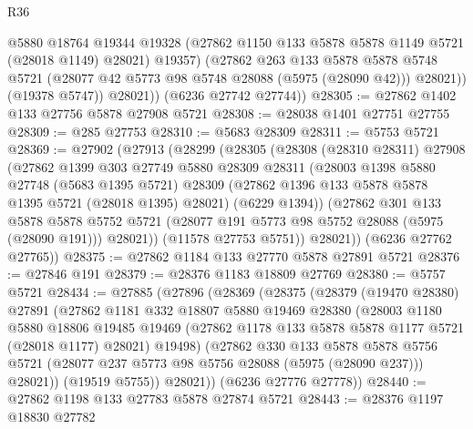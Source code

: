 \begin{lexlean}{R36}
\begin{coremodule}
                @5880
                @18764
                @19344
                @19328
                (@27862 @1150 @133 @5878 @5878 @1149 @5721 (@28018 @1149) @28021)
                @19357)
              (@27862
                @263
                @133
                @5878
                @5878
                @5748
                @5721
                (@28077 @42 @5773 @98 @5748 @28088 (@5975 (@28090 @42)))
                @28021))
            (@19378 @5747))
          @28021))
      (@6236 @27742 @27744))
@28305 := @27862 @1402 @133 @27756 @5878 @27908 @5721
@28308 := @28038 @1401 @27751 @27755
@28309 := @285 @27753
@28310 := @5683 @28309
@28311 := @5753 @5721
@28369 := @27902
    (@27913
      (@28299
        (@28305
          (@28308
            (@28310 @28311)
            @27908
            (@27862
              @1399
              @303
              @27749
              @5880
              @28309
              @28311
              (@28003
                @1398
                @5880
                @27748
                (@5683 @1395 @5721)
                @28309
                (@27862 @1396 @133 @5878 @5878 @1395 @5721 (@28018 @1395) @28021)
                (@6229 @1394))
              (@27862
                @301
                @133
                @5878
                @5878
                @5752
                @5721
                (@28077 @191 @5773 @98 @5752 @28088 (@5975 (@28090 @191)))
                @28021))
            (@11578 @27753 @5751))
          @28021))
      (@6236 @27762 @27765))
@28375 := @27862 @1184 @133 @27770 @5878 @27891 @5721
@28376 := @27846 @191
@28379 := @28376 @1183 @18809 @27769
@28380 := @5757 @5721
@28434 := @27885
    (@27896
      (@28369
        (@28375
          (@28379
            (@19470 @28380)
            @27891
            (@27862
              @1181
              @332
              @18807
              @5880
              @19469
              @28380
              (@28003
                @1180
                @5880
                @18806
                @19485
                @19469
                (@27862 @1178 @133 @5878 @5878 @1177 @5721 (@28018 @1177) @28021)
                @19498)
              (@27862
                @330
                @133
                @5878
                @5878
                @5756
                @5721
                (@28077 @237 @5773 @98 @5756 @28088 (@5975 (@28090 @237)))
                @28021))
            (@19519 @5755))
          @28021))
      (@6236 @27776 @27778))
@28440 := @27862 @1198 @133 @27783 @5878 @27874 @5721
@28443 := @28376 @1197 @18830 @27782

\end{coremodule}
\end{lexlean}
